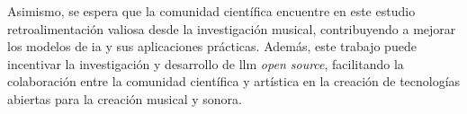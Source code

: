 Asimismo, se espera que la comunidad científica encuentre en este estudio retroalimentación valiosa desde la investigación musical, contribuyendo a mejorar los modelos de \gls{ia} y sus aplicaciones prácticas. Además, este trabajo puede incentivar la investigación y desarrollo de \gls{llm} \emph{open source}, facilitando la colaboración entre la comunidad científica y artística en la creación de tecnologías abiertas para la creación musical y sonora.